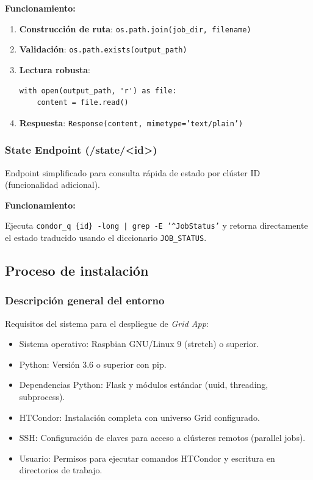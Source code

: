\textbf{Funcionamiento:}

\begin{enumerate}
	\item \textbf{Construcción de ruta}: \texttt{os.path.join(job\_dir, filename)}

	\item \textbf{Validación}: \texttt{os.path.exists(output\_path)}

	\item \textbf{Lectura robusta}:
	      \begin{verbatim}
with open(output_path, 'r') as file:
    content = file.read()
	      \end{verbatim}

	\item \textbf{Respuesta}: \texttt{Response(content, mimetype='text/plain')}
\end{enumerate}

\subsubsection{State Endpoint (/state/<id>)}
\noindent

Endpoint simplificado para consulta rápida de estado por clúster ID (funcionalidad adicional).

\textbf{Funcionamiento:}

Ejecuta \texttt{condor\_q \{id\} -long | grep -E '\^{}JobStatus'} y retorna directamente el estado traducido usando el diccionario \texttt{JOB\_STATUS}.

\subsection{Proceso de instalación}
\noindent

\subsubsection{Descripción general del entorno}
\noindent
Requisitos del sistema para el despliegue de \textit{Grid App}:

\begin{itemize}
	\item Sistema operativo: Raspbian GNU/Linux 9 (stretch) o superior.
	\item Python: Versión 3.6 o superior con pip.
	\item Dependencias Python: Flask y módulos estándar (uuid, threading, subprocess).
	\item HTCondor: Instalación completa con universo Grid configurado.
	\item SSH: Configuración de claves para acceso a clústeres remotos (parallel jobs).
	\item Usuario: Permisos para ejecutar comandos HTCondor y escritura en directorios de trabajo.
\end{itemize}

